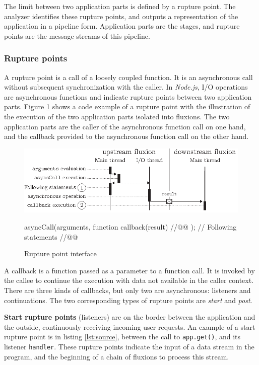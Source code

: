 The limit between two application parts is defined by a rupture point.
The analyzer identifies these rupture points, and outputs a representation of the application in a pipeline form.
Application parts are the stages, and rupture points are the message streams of this pipeline.

\subsubsection{Rupture points} \label{section:compiler:analyzer:rupture}

A rupture point is a call of a loosely coupled function.
It is an asynchronous call without subsequent synchronization with the caller.
In \textit{Node.js}, I/O operations are asynchronous functions and indicate rupture points between two application parts.
Figure \ref{fig:basicrp} shows a code example of a rupture point with the illustration of the execution of the two application parts isolated into fluxions.
The two application parts are the caller of the asynchronous function call on one hand, and the callback provided to the asynchronous function call on the other hand.

\begin{figure}[h!]
  \includegraphics[width=\linewidth]{basicrp.ps}
  \begin{code}
asyncCall(arguments, function callback(result){ //@@ });
// Following statements //@@
  \end{code}
  \caption{Rupture point interface}
  \label{fig:basicrp}
\end{figure}

A callback is a function passed as a parameter to a function call.
It is invoked by the callee to continue the execution with data not available in the caller context.
There are three kinds of callbacks, but only two are asynchronous: listeners and continuations.
The two corresponding types of rupture points are \textit{start} and \textit{post}.

\textbf{Start rupture points} (listeners) are on the border between the application and the outside, continuously receiving incoming user requests.
An example of a start rupture point is in listing \ref{lst:source}, between the call to \texttt{app.get()}, and its listener \texttt{handler}.
These rupture points indicate the input of a data stream in the program, and the beginning of a chain of fluxions to process this stream.

